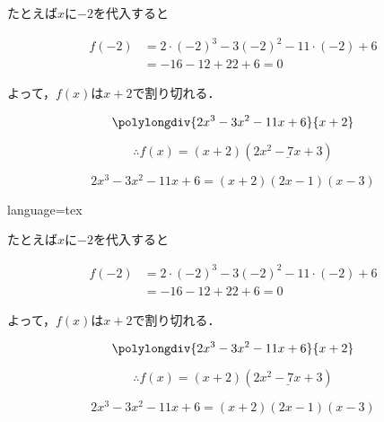 \documentclass[../main]{subfiles}
\begin{document}
\begin{BracketBox}


	たとえば$x$に$-2$を代入すると

    \begin{align*}
        f(-2) &= 2\cdot (-2)^3 - 3(-2)^2 - 11\cdot (-2)+6 \\
              &= -16-12+22+6 = 0
    \end{align*}

    よって，$f(x)$は$x+2$で割り切れる．

    \begin{equation*}
        \polylongdiv{2x^3-3x^2-11x+6}{x+2}
    \end{equation*}

    \begin{equation*}
        \therefore f(x) = (x+2)(\underline{2x^2-7x+3})
    \end{equation*}

    \begin{equation*}
        2x^3-3x^2-11x+6 = (x+2)(2x-1)(x-3)
    \end{equation*}

\end{BracketBox}
\begin{Code}{language=tex}
\begin{BracketBox}


	たとえば$x$に$-2$を代入すると

    \begin{align*}
        f(-2) &= 2\cdot (-2)^3 - 3(-2)^2 - 11\cdot (-2)+6 \\
                &= -16-12+22+6 = 0
    \end{align*}

    よって，$f(x)$は$x+2$で割り切れる．

    \begin{equation*}
        \polylongdiv{2x^3-3x^2-11x+6}{x+2}
    \end{equation*}

    \begin{equation*}
        \therefore f(x) = (x+2)(\underline{2x^2-7x+3})
    \end{equation*}

    \begin{equation*}
        2x^3-3x^2-11x+6 = (x+2)(2x-1)(x-3)
    \end{equation*}

\end{BracketBox}
\end{Code}
\end{document}
